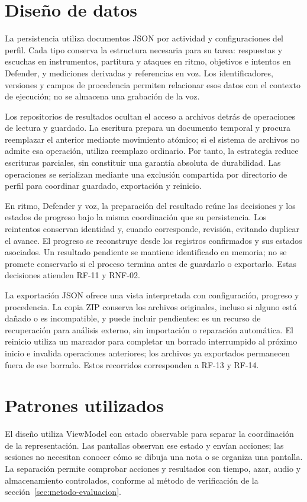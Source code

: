 \section{Diseño de datos}
\label{sec:diseno-datos}
La persistencia utiliza documentos JSON por actividad y configuraciones del
perfil. Cada tipo conserva la estructura necesaria para su tarea: respuestas
y escuchas en instrumentos, partitura y ataques en ritmo, objetivos e intentos
en Defender, y mediciones derivadas y referencias en voz. Los identificadores,
versiones y campos de procedencia permiten relacionar esos datos con el contexto
de ejecución; no se almacena una grabación de la voz.

Los repositorios de resultados ocultan el acceso a archivos detrás de operaciones
de lectura y guardado. La escritura prepara un documento temporal y procura
reemplazar el anterior mediante movimiento atómico; si el sistema de archivos
no admite esa operación, utiliza reemplazo ordinario. Por tanto, la estrategia
reduce escrituras parciales, sin constituir una garantía absoluta de durabilidad.
Las operaciones se serializan mediante una exclusión compartida por directorio
de perfil para coordinar guardado, exportación y reinicio.

En ritmo, Defender y voz, la preparación del resultado reúne las decisiones y
los estados de progreso bajo la misma coordinación que su persistencia. Los
reintentos conservan identidad y, cuando corresponde, revisión, evitando duplicar
el avance. El progreso se reconstruye desde los registros confirmados y sus
estados asociados. Un resultado pendiente se mantiene identificado en memoria;
no se promete conservarlo si el proceso termina antes de guardarlo o exportarlo.
Estas decisiones atienden RF-11 y RNF-02.

La exportación JSON ofrece una vista interpretada con configuración, progreso
y procedencia. La copia ZIP conserva los archivos originales, incluso si alguno
está dañado o es incompatible, y puede incluir pendientes: es un recurso de
recuperación para análisis externo, sin importación o reparación automática.
El reinicio utiliza un marcador para completar un borrado interrumpido al próximo
inicio e invalida operaciones anteriores; los archivos ya exportados permanecen
fuera de ese borrado. Estos recorridos corresponden a RF-13 y RF-14.

\section{Patrones utilizados}
\label{sec:patrones-diseno}
El diseño utiliza ViewModel con estado observable para separar la coordinación
de la representación. Las pantallas observan ese estado y envían acciones;
las sesiones no necesitan conocer cómo se dibuja una nota o se organiza una
pantalla. La separación permite comprobar acciones y resultados con tiempo,
azar, audio y almacenamiento controlados, conforme al método de verificación
de la sección~\ref{sec:metodo-evaluacion}.

